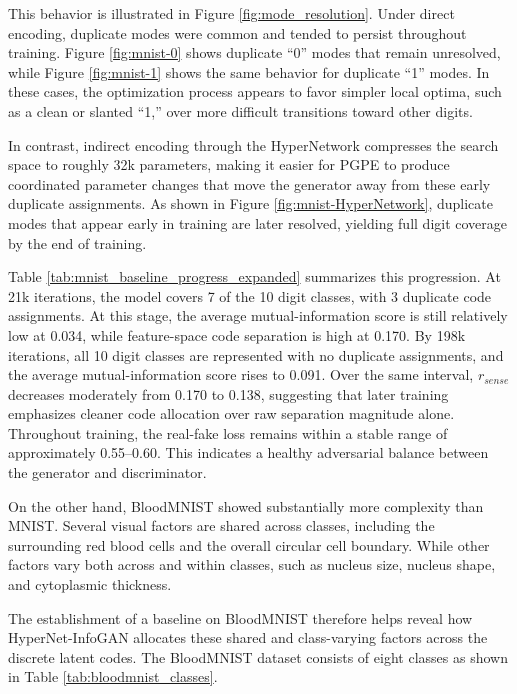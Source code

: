 \documentclass[letterpaper]{article} %
\begin{document}
	This behavior is illustrated in Figure \ref{fig:mode_resolution}. Under direct encoding, duplicate modes were common and tended to persist throughout training. Figure \ref{fig:mnist-0} shows duplicate ``0'' modes that remain unresolved, while Figure \ref{fig:mnist-1} shows the same behavior for duplicate ``1'' modes. In these cases, the optimization process appears to favor simpler local optima, such as a clean or slanted ``1,'' over more difficult transitions toward other digits. 
	
	In contrast, indirect encoding through the HyperNetwork compresses the search space to roughly 32k parameters, making it easier for PGPE to produce coordinated parameter changes that move the generator away from these early duplicate assignments. As shown in Figure \ref{fig:mnist-HyperNetwork}, duplicate modes that appear early in training are later resolved, yielding full digit coverage by the end of training.

	Table \ref{tab:mnist_baseline_progress_expanded} summarizes this progression. At 21k iterations, the model covers 7 of the 10 digit classes, with 3 duplicate code assignments. At this stage, the average mutual-information score is still relatively low at 0.034, while feature-space code separation is high at 0.170. By 198k iterations, all 10 digit classes are represented with no duplicate assignments, and the average mutual-information score rises to 0.091. Over the same interval, $r_{sense}$ decreases moderately from 0.170 to 0.138, suggesting that later training emphasizes cleaner code allocation over raw separation magnitude alone. Throughout training, the real-fake loss remains within a stable range of approximately 0.55--0.60. This indicates a healthy adversarial balance between the generator and discriminator.

	On the other hand, BloodMNIST showed substantially more complexity than MNIST. Several visual factors are shared across classes, including the surrounding red blood cells and the overall circular cell boundary. While other factors vary both across and within classes, such as nucleus size, nucleus shape, and cytoplasmic thickness. 
	
	The establishment of a baseline on BloodMNIST therefore helps reveal how HyperNet-InfoGAN allocates these shared and class-varying factors across the discrete latent codes.  The BloodMNIST dataset consists of eight classes as shown in Table \ref{tab:bloodmnist_classes}.
	
\end{document}

